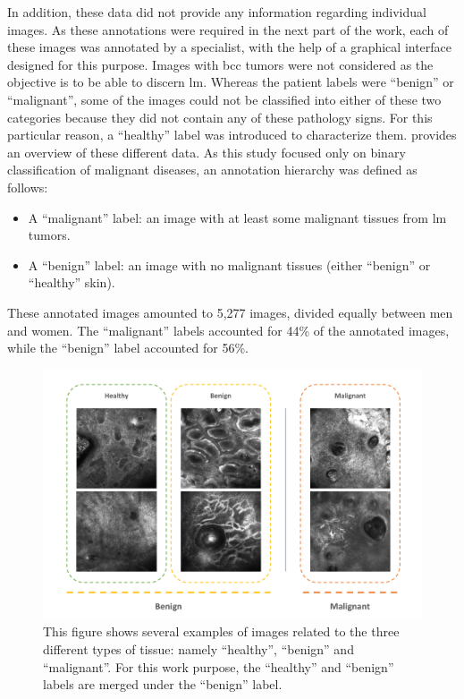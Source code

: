 \documentclass[journal,article,submit,moreauthors,pdftex, applsci]{Definitions/mdpi}
\begin{document}
In addition, these data did not provide any information regarding individual images. As these annotations were required in the next part of the work, each of these images was annotated by a specialist, with the help of a graphical interface designed for this purpose. Images with \ac{bcc} tumors were not considered as the objective is to be able to discern \ac{lm}. Whereas the patient labels were “benign” or “malignant”, some of the images could not be classified into either of these two categories because they did not contain any of these pathology signs. For this particular reason, a “healthy” label was introduced to characterize them.  provides an overview of these different data. As this study focused only on binary classification of malignant diseases, an annotation hierarchy was defined as follows:
\begin{itemize}  
\item A “malignant” label: an image with at least some malignant tissues from \ac{lm} tumors.
\item A “benign” label: an image with no malignant tissues (either “benign” or “healthy” skin).
\end{itemize}
These annotated images amounted to 5,277 images, divided equally between men and women. The “malignant” labels accounted for 44\% of the annotated images, while the “benign” label accounted for 56\%.\par
\begin{figure}[h]
    \begin{center}
        \includegraphics[width=\linewidth]{Figures/Data.pdf}
        \caption{This figure shows several examples of images related to the three different types of tissue: namely “healthy”, “benign” and “malignant”. For this work purpose, the “healthy” and “benign” labels are merged under the “benign” label.}
        \label{fig:data}
    \end{center} 
\end{figure}\par
\end{document}
